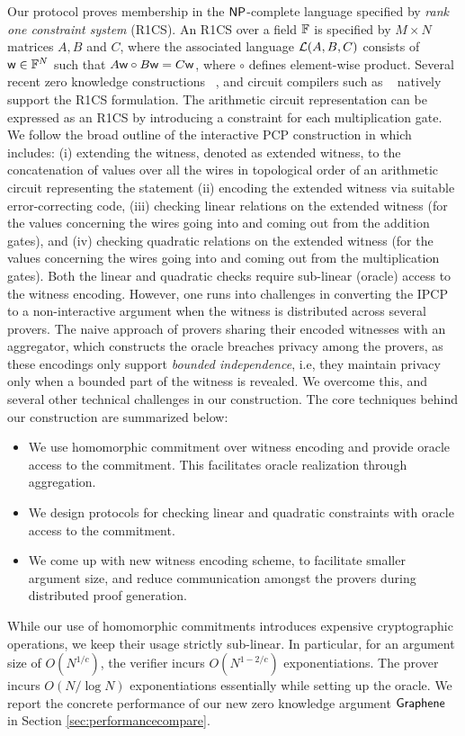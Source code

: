 Our protocol proves membership in the $\mathsf{NP}$-complete
language specified by {\em rank one constraint system} (R1CS). An R1CS over a
field $\mathbb{F}$ is specified by $M\times N$ matrices $A,B$ and $C$, where the
associated language $\mathcal{L}(A,B,C)$ consists of $\mathsf{w}\in \mathbb{F}^N$ such that
$A\mathsf{w}\circ B\mathsf{w}=C\mathsf{w}$, where $\circ$ defines element-wise product. Several
recent zero knowledge constructions ~\cite{Groth16,aurora,marlin}, and 
circuit compilers such as ~\cite{zokrates} natively support the R1CS formulation. 
The arithmetic circuit representation can  be
expressed as an R1CS by introducing a constraint for each multiplication gate.
We follow the broad outline of the interactive PCP
construction in \cite{ligero} which includes: (i) extending the witness, denoted as extended witness, to the concatenation of values over all the wires in topological order of an arithmetic circuit  representing the statement   (ii) encoding the extended witness via suitable
error-correcting code, (iii) checking linear relations on the extended witness (for the values concerning the wires going into and coming out from the addition gates), and
(iv) checking quadratic relations on
the extended witness  (for the values concerning the wires going into and coming out from the multiplication gates). Both the linear and quadratic checks require sub-linear (oracle) access to the 
witness encoding.
However, one runs into 
challenges in converting the IPCP to a non-interactive
argument when the witness is distributed across several provers. The naive
approach of provers sharing their encoded witnesses with an aggregator, which
constructs the oracle breaches privacy among the provers, as these encodings
only support {\em bounded independence}, i.e, they maintain privacy only when a
bounded part of the witness is revealed. We overcome this, and several other
technical challenges in our construction. The core techniques behind our
construction are summarized below:
\begin{itemize}
\item We use homomorphic commitment over witness encoding and provide oracle
access to the commitment. This facilitates oracle realization through
aggregation.
\item We design protocols for checking linear and quadratic constraints
with oracle access to the commitment.
\item We come up with new witness encoding scheme, to facilitate smaller
argument size, and reduce communication amongst the provers during distributed proof
generation.
\end{itemize}
While our use of homomorphic commitments introduces expensive cryptographic
operations, we keep their usage strictly sub-linear. In particular, for an
argument size of $O(N^{1/c})$, the verifier 
incurs $O(N^{1-2/c})$ exponentiations. The prover incurs
$O(N/\log N)$ exponentiations essentially while
setting up the oracle. We report the concrete performance of our new zero
knowledge argument $\textsf{Graphene}$ in Section
\ref{sec:performancecompare}.
